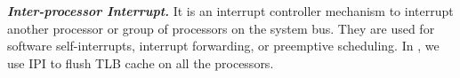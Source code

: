 \textbf{\textit{Inter-processor Interrupt.}}  It is an interrupt controller mechanism to interrupt another processor or group of processors on the system bus. They are used for software self-interrupts, interrupt forwarding, or preemptive scheduling. In \name, we use IPI to flush TLB cache on all the processors.

%
%
%
